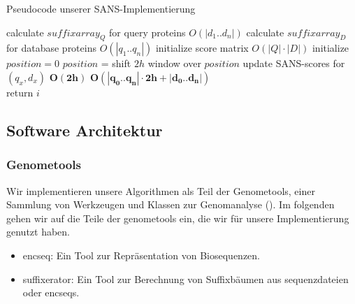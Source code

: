 \documentclass{article}
\begin{document}
\begin{algorithm}
  \caption{Pseudocode unserer SANS-Implementierung}
 \begin{algorithmic}
     \State calculate $suffixarray_Q$ for query proteins \Comment $O(|d_1..d_n|)$
     \State calculate $suffixarray_D$ for database proteins \Comment $O(|q_1..q_n|)$
     \State initialize score matrix \Comment $O(|Q|\cdot|D|)$
     \State initialize $position = 0$
       \State  $position$ =  
       \State shift $2h$ window over $position$ 
         \State update SANS-scores for  $(q_x,d_x)$
       \EndFor \Comment $\mathbf{O(2h)}$
     \EndFor \Comment $\mathbf{O(|q_0..q_n|\cdot2h + |d_0..d_n|)}$
    \EndFunction  {}   \\
    
          \State return $i$ 
        \EndIf
      \EndFor 
    \EndFunction
  \end{algorithmic}
\end{algorithm}

\subsection{Software Architektur}

\subsubsection{Genometools}

Wir implementieren unsere Algorithmen als Teil der Genometools, einer Sammlung von Werkzeugen und Klassen zur Genomanalyse (\cite{gtools}).
Im folgenden gehen wir auf die Teile der genometools ein, die wir für unsere Implementierung genutzt haben.
\begin{itemize}
  \item encseq: Ein Tool zur Repräsentation von Biosequenzen.
  \item suffixerator: Ein Tool zur Berechnung von Suffixbäumen aus sequenzdateien oder encseqs.
\end{itemize}
\end{document}
